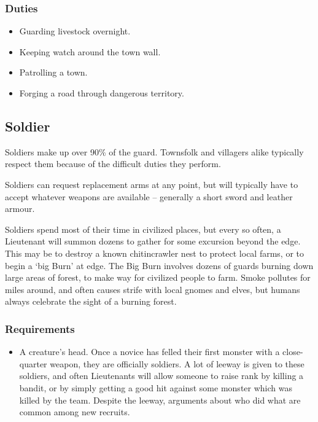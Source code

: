 \begin{multicols}{2}
\subsubsection{Duties}

\begin{itemize}
  \item
  Guarding livestock overnight.
  \item
  Keeping watch around the town wall.
  \item
  Patrolling a town.
  \item
  Forging a road through dangerous territory.
\end{itemize}

\subsection{Soldier}

Soldiers make up over 90\% of the \gls{guard}.
Townsfolk and villagers alike typically respect them because of the difficult duties they perform.

Soldiers can request replacement arms at any point, but will typically have to accept whatever weapons are available -- generally a short sword and leather armour.

Soldiers spend most of their time in civilized places, but every so often, a Lieutenant will summon dozens to gather for some excursion beyond the \gls{edge}.
This may be to destroy a known chitincrawler nest to protect local farms, or to begin a `big Burn' at \gls{edge}.
The Big Burn involves dozens of \glspl{guard} burning down large areas of forest, to make way for civilized people to farm.
Smoke pollutes for miles around, and often causes strife with local gnomes and elves, but humans always celebrate the sight of a burning forest.

\subsubsection{Requirements}

\begin{itemize}
  \item
  A creature's head.
  Once a novice has felled their first monster with a close-quarter weapon, they are officially soldiers.
  A lot of leeway is given to these soldiers, and often Lieutenants will allow someone to raise rank by killing a bandit, or by simply getting a good hit against some monster which was killed by the team.
  Despite the leeway, arguments about who did what are common among new recruits.


\end{itemize}
\end{multicols}
